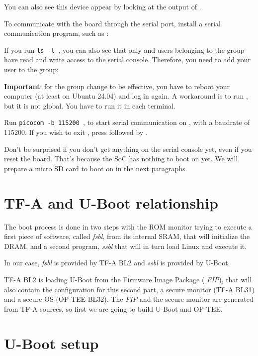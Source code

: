 You can also see this device appear by looking at the output of
.

To communicate with the board through the serial port, install a
serial communication program, such as :


If you run {\tt ls -l \hosttty}, you can also see that only
 and users belonging to the  group have
read and write access to the serial console. Therefore, you need
to add your user to the  group:


{\bf Important}: for the group change to be effective, you have to
reboot your computer (at least on Ubuntu 24.04) and log in again.
A workaround is to run , but it is not global.
You have to run it in each terminal.

Run {\tt picocom -b 115200 \hosttty}, to start serial
communication on {\tt \hosttty}, with a baudrate of 115200.
If you wish to exit , press \code{[Ctrl][a]} followed by
\code{[Ctrl][x]}.

Don't be surprised if you don't get anything on the serial console yet,
even if you reset the board. That's because the SoC has nothing to boot
on yet. We will prepare a micro SD card to boot on in the next paragraphs.

\section{TF-A and U-Boot relationship}

The boot process is done in two steps with the ROM monitor trying to
execute a first piece of software, called {\em fsbl}, from its
internal SRAM, that will initialize the DRAM, and a second program,
{\em ssbl} that will in turn load Linux and execute it.

In our case, {\em fsbl} is provided by TF-A BL2 and {\em
  ssbl} is provided by U-Boot.

TF-A BL2 is loading U-Boot from the Firmware Image Package ({\em
  FIP}), that will also contain the configuration for this second
part, a secure monitor (TF-A BL31) and a secure OS (OP-TEE BL32).
The {\em FIP} and the secure monitor are generated from TF-A sources,
so first we are going to build U-Boot and OP-TEE.

\section{U-Boot setup}

